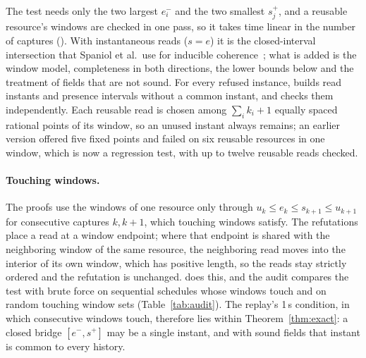 The test needs only the two largest $e_i^-$ and the two smallest $s_j^+$, and a
reusable resource's windows are checked in one pass, so it takes time linear
in the number of captures (). With instantaneous reads
($s=e$) it is the closed-interval intersection that Spaniol et al.\ use for
inducible coherence~\cite{spaniol2009}; what is added is the window model,
completeness in both directions, the lower bounds below and the treatment of
fields that are not sound. For every refused instance, 
builds read instants and presence intervals without a common instant, and
 checks them independently. Each reusable read
is chosen among $\sum_ik_i+1$ equally spaced rational points of its window, so
an unused instant always remains; an earlier version offered five fixed points
and failed on six reusable resources in one window, which is now a regression
test, with up to twelve reusable reads checked.

\paragraph{Touching windows.} The proofs use the windows of one resource only
through $u_k\le e_k\le s_{k+1}\le u_{k+1}$ for consecutive captures $k,k+1$,
which touching windows satisfy. The refutations place a read at a window
endpoint; where that endpoint is shared with the neighboring window of the same
resource, the neighboring read moves into the interior of its own window, which
has positive length, so the reads stay strictly ordered and the refutation is
unchanged.  does this, and the audit compares the test
with brute force on sequential schedules whose windows touch and on random
touching window sets (Table~\ref{tab:audit}). The replay's 1\,s condition, in
which consecutive windows touch, therefore lies within Theorem~\ref{thm:exact}:
a closed bridge $[e^-,s^+]$ may be a single instant, and with sound fields that
instant is common to every history.

